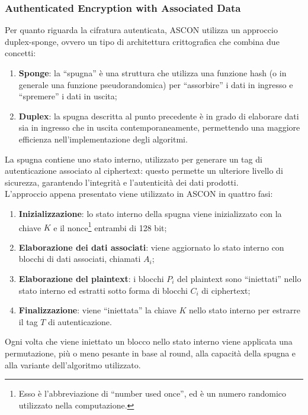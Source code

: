 \subsubsection{Authenticated Encryption with Associated Data}

Per quanto riguarda la cifratura autenticata, ASCON utilizza un approccio duplex-sponge\cite{ascon-specification}, ovvero un tipo di architettura crittografica che combina due concetti:
\begin{enumerate}[label=\Roman*.]
    \item \textbf{Sponge}: la ``spugna'' è una struttura che utilizza una funzione hash (o in generale una funzione pseudorandomica) per ``assorbire'' i dati in ingresso e ``spremere'' i dati in uscita;
    \item \textbf{Duplex}: la spugna descritta al punto precedente è in grado di elaborare dati sia in ingresso che in uscita contemporaneamente, permettendo una maggiore efficienza nell'implementazione degli algoritmi.
\end{enumerate}
La spugna contiene uno stato interno, utilizzato per generare un tag di autenticazione associato al ciphertext: questo permette un ulteriore livello di sicurezza, garantendo l'integrità e l'autenticità dei dati prodotti. \\

\noindent L'approccio appena presentato viene utilizzato in ASCON in quattro fasi\cite{ascon-specification}:
\begin{enumerate}
    \item \textbf{Inizializzazione}: lo stato interno della spugna viene inizializzato con la chiave $K$ e il nonce\footnote{Esso è l'abbreviazione di ``number used once'', ed è un numero randomico utilizzato nella computazione.} entrambi di 128 bit;
    \item \textbf{Elaborazione dei dati associati}: viene aggiornato lo stato interno con blocchi di dati associati, chiamati $A_i$;
    \item \textbf{Elaborazione del plaintext}: i blocchi $P_i$ del plaintext sono ``iniettati'' nello stato interno ed estratti sotto forma di blocchi $C_i$ di ciphertext;
    \item \textbf{Finalizzazione}: viene ``iniettata'' la chiave $K$ nello stato interno per estrarre il tag $T$ di autenticazione.
\end{enumerate}
Ogni volta che viene iniettato un blocco nello stato interno viene applicata una permutazione, più o meno pesante in base al round, alla capacità della spugna e alla variante dell'algoritmo utilizzato. \\

